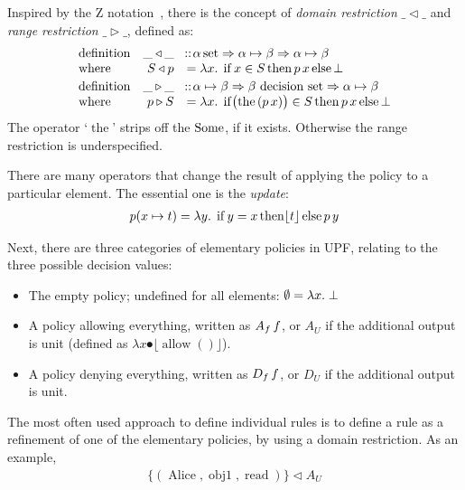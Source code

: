 Inspired by the Z notation~\cite{spivey:z-notation:1992}, there is the
concept of \emph{domain restriction} $\_ \triangleleft \_$ and
\emph{range restriction} $\_ \triangleright \_$, defined as:
\begin{gather*}
  \begin{array}{lrl}
    {\operatorname{definition}} &\_ \triangleleft \_&\!::\! \alpha\,\mathrm{set}
           \Rightarrow \alpha \mapsto \beta \Rightarrow \alpha \mapsto \beta\\
    {\operatorname{where}} & S \triangleleft p &= \lambda x.\; \operatorname{if} x \in S \operatorname{then} p\, x
    \operatorname{else} \bot \\[.5ex]
    {\operatorname{definition}} & \_ \triangleright \_ &\!::\! \alpha \mapsto
    \beta \Rightarrow \beta\,\operatorname{decision}\,\mathrm{set}
    \Rightarrow \alpha \mapsto \beta \\ 
    {\operatorname{where}} & p \triangleright S &= \lambda x.\; \operatorname{if}
    \bigl(\operatorname{the}\,
    (p\, x)\bigr) \in S \operatorname{then} p\, x \operatorname{else} \bot \\
  \end{array}
\end{gather*}
The operator `$\operatorname{the}$' strips off the $\operatorname{Some}$, if it
exists. Otherwise the range restriction is underspecified.

There are many operators that change the result of applying the
policy to a particular element. The essential one is the
\emph{update}:
\begin{gather*}
  p(x \mapsto t) = \lambda y.\; \operatorname{if} y = x \operatorname{then} \lfloor
  t\rfloor \operatorname{else} p\, y
\end{gather*}

Next, there are three categories of elementary policies in UPF,
relating to the three possible decision values:
\begin{itemize}
\item The empty policy; undefined for all elements: $\emptyset =
  \lambda x.\; \bot$
\item A policy allowing everything, written as $A_f\, f$, or $A_U$ if
  the additional output is unit (defined as $\lambda x\spot \lfloor
  \operatorname{allow} ()\rfloor$).
\item A policy denying everything, written as $D_f\, f$, or $D_U$ if
  the additional output is unit.
\end{itemize}

The most often used approach to define individual rules is to define a
rule as a refinement of one of the elementary policies, by using a
domain restriction. As an example,
\begin{gather*}
\bigl\{(\operatorname{Alice}, \operatorname{obj1},
\operatorname{read})\bigr\} \triangleleft A_U
\end{gather*}

